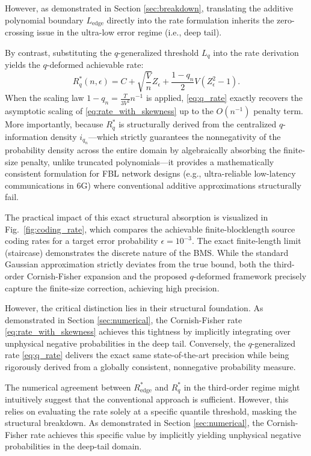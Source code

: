 \documentclass[conference]{IEEEtran}
\begin{document}
However, as demonstrated in Section \ref{sec:breakdown}, translating the additive polynomial boundary $L_{\text{edge}}$ directly into the rate formulation inherits the zero-crossing issue in the ultra-low error regime (i.e., deep tail). 

By contrast, substituting the $q$-generalized threshold $L_q$ into the rate derivation yields the $q$-deformed achievable rate:
\begin{equation}
    R_q^*(n, \epsilon) = C + \sqrt{\frac{V}{n}} Z_\epsilon + \frac{1-q_n}{2} V (Z_\epsilon^2 - 1).
    \label{eq:q_rate}
\end{equation}
When the scaling law $1-q_n = \frac{T}{3V^2} n^{-1}$ is applied, \eqref{eq:q_rate} exactly recovers the asymptotic scaling of \eqref{eq:rate_with_skewness} up to the $O(n^{-1})$ penalty term. More importantly, because $R_q^*$ is structurally derived from the centralized $q$-information density $i_{q_n}$---which strictly guarantees the nonnegativity of the probability density across the entire domain by algebraically absorbing the finite-size penalty, unlike truncated polynomials---it provides a mathematically consistent formulation for FBL network designs (e.g., ultra-reliable low-latency communications in 6G) where conventional additive approximations structurally fail.

The practical impact of this exact structural absorption is visualized in Fig.~\ref{fig:coding_rate}, which compares the achievable finite-blocklength source coding rates for a target error probability $\epsilon = 10^{-3}$. The exact finite-length limit (staircase) demonstrates the discrete nature of the BMS. While the standard Gaussian approximation strictly deviates from the true bound, both the third-order Cornish-Fisher expansion and the proposed $q$-deformed framework precisely capture the finite-size correction, achieving high precision. 

However, the critical distinction lies in their structural foundation. As demonstrated in Section \ref{sec:numerical}, the Cornish-Fisher rate \eqref{eq:rate_with_skewness} achieves this tightness by implicitly integrating over unphysical negative probabilities in the deep tail. Conversely, the $q$-generalized rate \eqref{eq:q_rate} delivers the exact same state-of-the-art precision while being rigorously derived from a globally consistent, nonnegative probability measure.

The numerical agreement between $R_{\text{edge}}^*$ and $R_q^*$ in the third-order regime might intuitively suggest that the conventional approach is sufficient. However, this relies on evaluating the rate solely at a specific quantile threshold, masking the structural breakdown. As demonstrated in Section \ref{sec:numerical}, the Cornish-Fisher rate achieves this specific value by implicitly yielding unphysical negative probabilities in the deep-tail domain. 
\end{document}
